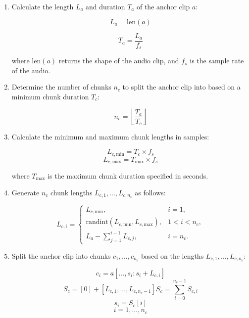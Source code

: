 \begin{enumerate}
\item Calculate the length $L_a$ and duration $T_a$ of the anchor clip $a$:

\begin{equation}
L_a = \text{len}(a)
\end{equation}

\begin{equation}
T_a = \frac{L_a}{f_s}
\end{equation}

where $\text{len}(a)$ returns the shape of the audio clip, and $f_s$ is the sample rate of the audio.

\item Determine the number of chunks $n_c$ to split the anchor clip into based on a minimum chunk duration $T_c$:

\begin{equation}
n_c = \left\lfloor\frac{T_a}{T_c}\right\rfloor
\end{equation}

\item Calculate the minimum and maximum chunk lengths in samples:

\begin{equation}
L_{c,\text{min}} = T_c \times f_s
\end{equation}
\begin{equation}
L_{c,\text{max}} = T_{\text{max}} \times f_s
\end{equation}

where $T_{\text{max}}$ is the maximum chunk duration specified in seconds.

\item Generate $n_c$ chunk lengths $L_{c,1},\ldots,L_{c,n_c}$ as follows:

\begin{equation}
L_{c,i} = \begin{cases}
L_{c,\text{min}}, & i=1, \\
\text{randint}(L_{c,\text{min}}, L_{c,\text{max}}), & 1<i<n_c, \\
L_a - \sum_{j=1}^{i-1} L_{c,j}, & i=n_c.
\end{cases}
\end{equation}

\item Split the anchor clip into chunks $c_1,\ldots,c_{n_c}$ based on the lengths $L_{c,1},\ldots,L_{c,n_c}$:

\begin{equation}
c_i = a[..., s_i : s_i + L_{c,i}]
\end{equation}
\begin{equation}
S_c = [0] + [L_{c,1},...,L_{c,n_c-1}]
S_c = \sum_{i=0}^{n_c-1} S_{c,i}
\end{equation}
\begin{equation}
s_i = S_c[i]
\end{equation}
\begin{equation}
i=1,\ldots,n_c
\end{equation}


\end{enumerate}
